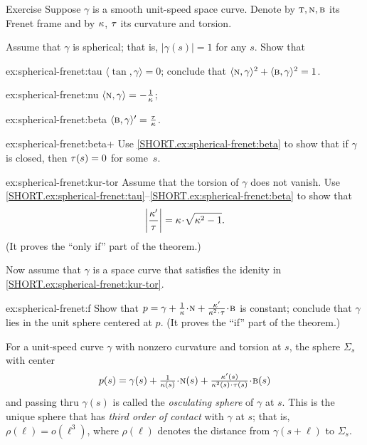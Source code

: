 \begin{thm}{Exercise}\label{ex:spherical-frenet}
Suppose $\gamma$ is a smooth unit-speed space curve.
Denote by $\text{\sc{t}},\text{\sc{n}},\text{\sc{b}}$ its Frenet frame and by $\kappa$, $\tau$ its curvature and torsion.

\smallskip

Assume that $\gamma$ is spherical; that is, $|\gamma(s)|=1$ for any $s$.
Show that

\begin{subthm}{ex:spherical-frenet:tau} $\langle\tan,\gamma\rangle=0$; conclude that $\langle\text{\sc{n}},\gamma\rangle^2+\langle\text{\sc{b}},\gamma\rangle^2=1$.
\end{subthm}

\begin{subthm}{ex:spherical-frenet:nu} $\langle\text{\sc{n}},\gamma\rangle=-\tfrac1{\kappa}$;
\end{subthm}

\begin{subthm}{ex:spherical-frenet:beta} $\langle\text{\sc{b}},\gamma\rangle'=\tfrac{\tau}{\kappa}$.
\end{subthm}

\begin{subthm}{ex:spherical-frenet:beta+}
Use \ref{SHORT.ex:spherical-frenet:beta} to show that if $\gamma$ is closed, then $\tau(s)=0$ for some~$s$.
\end{subthm}

\begin{subthm}{ex:spherical-frenet:kur-tor} Assume that the torsion of $\gamma$ does not vanish.
Use \ref{SHORT.ex:spherical-frenet:tau}--\ref{SHORT.ex:spherical-frenet:beta} to show that 
\[\left|\frac{\kur'}{\tor}\right|=\kur\cdot\sqrt{\kur^2-1}.\]
(It proves the ``only if'' part of the theorem.)
\end{subthm}
Now assume that $\gamma$ is a space curve that satisfies the idenity in \ref{SHORT.ex:spherical-frenet:kur-tor}.
\begin{subthm}{ex:spherical-frenet:f} Show that $p=\gamma+\tfrac1\kur\cdot \norm+\tfrac{\kur'}{\kur^2\cdot\tor}\cdot\bi$ is constant; conclude that $\gamma$ lies in the unit sphere centered at $p$.
(It proves the ``if'' part of the theorem.)
\end{subthm}

\end{thm}

For a unit-speed curve $\gamma$ with nonzero curvature and torsion at $s$,
the sphere $\Sigma_s$ with center
\[p(s)=\gamma(s)+\tfrac1{\kur(s)}\cdot \norm(s)+\tfrac{\kur'(s)}{\kur^2(s)\cdot\tor(s)}\cdot\bi(s)\]
and passing thru $\gamma(s)$ is called the \emph{osculating sphere} of $\gamma$ at $s$.
This is the unique sphere that has \emph{third order of contact} with $\gamma$ at $s$;
that is, $\rho(\ell)=o(\ell^3)$, where $\rho(\ell)$ denotes the distance from $\gamma(s+\ell)$ to $\Sigma_s$.
 
